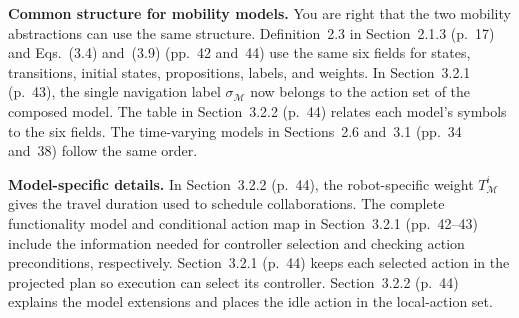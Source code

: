 \documentclass[11pt]{article}
\begin{document}
\textbf{Common structure for mobility models.} You are right that the two
mobility abstractions can use the same structure. Definition~2.3 in
Section~2.1.3 (p.~17) and Eqs.~(3.4) and~(3.9) (pp.~42 and~44) use the
same six fields for states, transitions, initial states, propositions,
labels, and weights. In Section~3.2.1 (p.~43), the single navigation
label $\sigma_{\mathcal{M}}$ now belongs to the action set of the composed
model. The table in Section~3.2.2 (p.~44) relates each model's symbols to
the six fields. The time-varying models in Sections~2.6 and~3.1
(pp.~34 and~38) follow the same order.

\textbf{Model-specific details.} In Section~3.2.2 (p.~44), the robot-specific
weight $T_{\mathcal{M}}^i$ gives the travel duration used to schedule collaborations.
The complete functionality model and conditional action map in Section~3.2.1
(pp.~42--43) include the information needed for controller selection and checking
action preconditions, respectively. Section~3.2.1 (p.~44)
keeps each selected action in the projected plan so execution can select
its controller. Section~3.2.2 (p.~44) explains the model extensions and
places the idle action in the local-action set.
\end{document}
